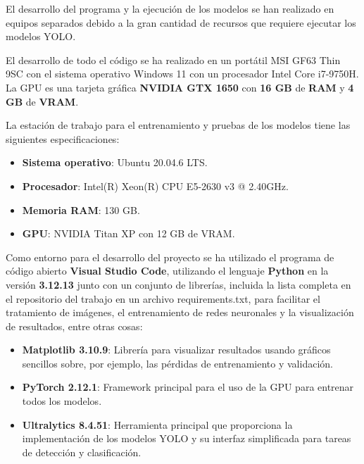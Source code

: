 \documentclass[12pt,a4paper,onecolumn,oneside]{report}
\begin{document}
El desarrollo del programa y la ejecución de los modelos se han realizado en equipos separados debido a la gran cantidad de recursos que requiere ejecutar los modelos YOLO. 

El desarrollo de todo el código se ha realizado en un portátil MSI GF63 Thin 9SC con el sistema operativo Windows 11 con un procesador Intel Core i7-9750H. La GPU es una tarjeta gráfica \textbf{NVIDIA GTX 1650} con \textbf{16 GB} de \textbf{RAM} y \textbf{4 GB} de \textbf{VRAM}.

La estación de trabajo para el entrenamiento y pruebas de los modelos tiene las siguientes especificaciones:

\begin{itemize}
    \item \textbf{Sistema operativo}: Ubuntu 20.04.6 LTS.
    
    \item \textbf{Procesador}: Intel(R) Xeon(R) CPU E5-2630 v3 @ 2.40GHz.
    
    \item \textbf{Memoria RAM}: 130 GB.
    
    \item \textbf{GPU}: NVIDIA Titan XP con 12 GB de VRAM.
\end{itemize}

Como entorno para el desarrollo del proyecto se ha utilizado el programa de código abierto \textbf{Visual Studio Code}, utilizando el lenguaje \textbf{Python} en la versión \textbf{3.12.13} junto con un conjunto de librerías, incluida la lista completa en el repositorio del trabajo en un archivo requirements.txt, para facilitar el tratamiento de imágenes, el entrenamiento de redes neuronales y la visualización de resultados, entre otras cosas:

\begin{itemize}
    \item \textbf{Matplotlib 3.10.9}: Librería para visualizar resultados usando gráficos sencillos sobre, por ejemplo, las pérdidas de entrenamiento y validación.

    \item \textbf{PyTorch 2.12.1}: Framework principal para el uso de la GPU para entrenar todos los modelos.

    \item \textbf{Ultralytics 8.4.51}: Herramienta principal que proporciona la implementación de los modelos YOLO y su interfaz simplificada para tareas de detección y clasificación.
\end{itemize}
\end{document}
